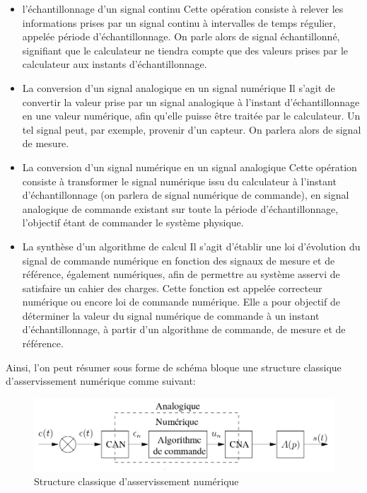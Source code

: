 \documentclass[french,a4paper,12pt]{report}
\begin{document}
	\begin{itemize}
		\item l'échantillonnage d'un signal continu
			Cette opération consiste à relever les informations prises par un signal continu à intervalles de temps
			régulier, appelée période d'échantillonnage. On parle alors de signal échantillonné, signifiant que le
			calculateur ne tiendra compte que des valeurs prises par le calculateur aux instants d'échantillonnage.
			
		\item La conversion d'un signal analogique en un signal numérique
			Il s'agit de convertir la valeur prise par un signal analogique à l'instant d'échantillonnage en une
			valeur numérique, afin qu'elle puisse être traitée par le calculateur. Un tel signal peut, par exemple, 
			provenir d'un capteur. On parlera alors de signal de mesure.
			 
		\item La conversion d'un signal numérique en un signal analogique
			Cette opération consiste à transformer le signal numérique issu du calculateur à l'instant 
			d'échantillonnage (on parlera de signal numérique de commande), en signal analogique de commande 
			existant sur toute la période d'échantillonnage, l'objectif étant de commander le système physique.
			
		\item  La synthèse d'un algorithme de calcul
			Il s'agit d'établir une loi d'évolution du signal de commande numérique en fonction des signaux de mesure
			et de référence, également numériques, afin de permettre au système asservi de satisfaire un cahier des
			charges. Cette fonction est appelée correcteur numérique ou encore loi de commande numérique. Elle a pour
			objectif de déterminer la valeur du signal numérique de commande à un instant d'échantillonnage, à partir 
			d'un algorithme de commande, de mesure et de référence.
	\end{itemize}
	
	Ainsi, l'on peut résumer sous forme de schéma bloque une structure classique d'asservissement numérique comme suivant:
	
	\begin{figure}[!ht]
    \center
  	\includegraphics[width=17cm]{Assert_1.png}
    \caption{Structure classique d'asservissement numérique}
	\end{figure}	
	
\end{document}
